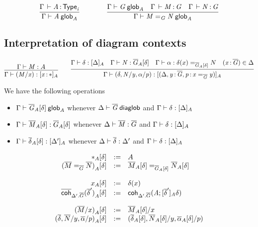 \begin{small}
  \[
  \infer{\wfglob{\Gamma}{A}{0}{A}}
  {\oftp{\Gamma}{A}{\typ{i}}}
  \qquad\qquad
  \infer{\wfglob{\Gamma}{\homj{G}{M}{N}}{n+1}{A}}
  {\wfglob{\Gamma}{G}{n}{A} &
    \oftp{\Gamma}{M}{G} &
    \oftp{\Gamma}{N}{G}
  }
  \]
\end{small}

\subsection{Interpretation of diagram contexts}

\begin{small}
  \[\infer{\ofinterp{\Gamma}{(M/x)}{\tptm{x}{\diagbase}}{A}}
  {\ofglob{\Gamma}{M}{A}}
  \qquad
  \infer{\ofinterp{\Gamma}{(\delta,N/y, \alpha/p)}
    {(\Delta,\tptm{y}{\diag G},\tptm{p}{\homj{\diag{G}}{x}{y}})}{A}}
  {\ofinterp{\Gamma}{\delta}{\Delta}{A}
    & \ofglob{\Gamma}{N}{\interpglob{\diag G}{A}{\delta}}
    & \ofdiaglob{\Gamma}{\alpha}{
      \homj{\interpglob{\diag G}{A}{\delta}}{\delta(x)}{N}}
    & (\tptm{x}{\diag G})\in\Delta}
\]
\end{small}

We have the following operations
\begin{itemize}
\item $\wfglob{\Gamma}{\interpglob{\diag G}{A}{\delta}}{}{A}$ whenever
  $\wfdiaglob{\Delta}{\diag G}$ and $\ofinterp{\Gamma}{\delta}{\Delta}{A}$
\item $\ofglob{\Gamma}{\interpglob{\diag M}{A}{\delta}}{} {\interpglob{\diag
      G}{A}{\delta}}$ whenever $\ofdiaglob{\Delta}{\diag M}{\diag G}$ and
  $\ofinterp{\Gamma}{\delta}{\Delta}{A}$
\item $\ofinterp{\Gamma}{\interpglob{\diag\delta}{A}{\delta}}{\Delta'}{A}$
  whenever $\ofdiaglob{\Delta}{\diag\delta}{\Delta'}$ and
  $\ofinterp{\Gamma}{\delta}{\Delta}{A}$
\end{itemize}

\begin{small}
  \[
  \begin{array}{rcl}
    \interpglob{\diagbase}{A}{\delta} & := & A \\
    \interpglob{(\homj{\diag G}{\diag M}{\diag N})}{A}{\delta} & := &
    \homj{\interpglob{\diag G}{A}{\delta}}{\interpglob{\diag M}{A}{\delta}}
    {\interpglob{\diag N}{A}{\delta}}\\\\

    \interpglob{x}{A}{\delta} & := & \delta(x) \\
    \interpglob{\diagcoh{\Delta'.\diag{G}}{\diag \delta'}}{A}{\delta} & := &
    \coh{\Delta'.\diag G}{A}{\interpdiag{\diag\delta'}{A}{\delta}}\\\\

    \interpglob{(\diag M/x)}{A}{\delta} & := &
    \interpglob{\diag M}{A}{\delta}/x \\
    \interpglob{(\diag \delta,\diag N/y,\diag \alpha/p)}{A}{\delta} & := &
    (\interpglob{\diag\delta}{A}{\delta},\interpglob{\diag N}{A}{\delta}/y,
    \interpglob{\diag\alpha}{A}{\delta}/p)
  \end{array}
  \]
\end{small}

